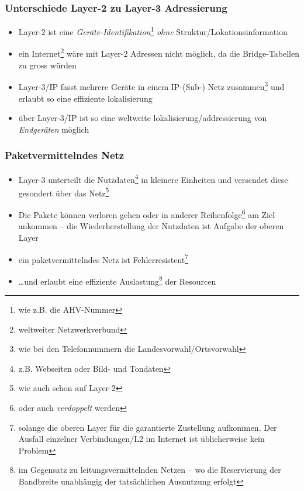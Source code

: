 \documentclass{beamer}
\begin{document}
\begin{frame}
\frametitle{Unterschiede Layer-2 zu Layer-3 Adressierung}
\begin{itemize}
	\item{Layer-2 ist eine {\em Ger\"ate-Identifikation}\footnote{wie z.B. die AHV-Nummer} {\em ohne} Struktur/Lokationsinformation}
	\item{ein Internet\footnote{weltweiter Netzwerkverbund} w\"are mit Layer-2 Adressen nicht m\"oglich, da die Bridge-Tabellen zu gross w\"urden}
	\item{Layer-3/IP fasst mehrere Ger\"ate in einem IP-(Sub-) Netz zusammen\footnote{wie bei den Telefonnummern die Landesvorwahl/Ortsvorwahl} und erlaubt so eine effiziente lokalisierung}
	\item{\"uber Layer-3/IP ist so eine weltweite lokalisierung/addressierung von {\em Endger\"aten} m\"oglich}
\end{itemize}
\end{frame}

\begin{frame}
\frametitle{Paketvermittelndes Netz}
\begin{itemize}
	\item{Layer-3 unterteilt die Nutzdaten\footnote{z.B. Webseiten oder Bild- und Tondaten} in kleinere Einheiten und versendet diese gesondert \"uber das Netz\footnote{wie auch schon auf Layer-2}}
	\item{Die Pakete k\"onnen verloren gehen oder in anderer Reihenfolge\footnote{oder auch {\em verdoppelt} werden} am Ziel ankommen -- die Wiederherstellung der Nutzdaten ist Aufgabe der oberen Layer}
	\item{ein paketvermittelndes Netz ist Fehlerresistent\footnote{solange die oberen Layer f\"ur die garantierte Zustellung aufkommen. Der Ausfall einzelner Verbindungen/L2 im Internet ist \"ublicherweise kein Problem}}
	\item{\ldots und erlaubt eine effiziente Auslastung\footnote{im Gegensatz zu leitungsvermittelnden Netzen -- wo die Reservierung der Bandbreite unabh\"angig der tats\"achlichen Ausnutzung erfolgt} der Resourcen}
\end{itemize}
\end{frame}
\end{document}
